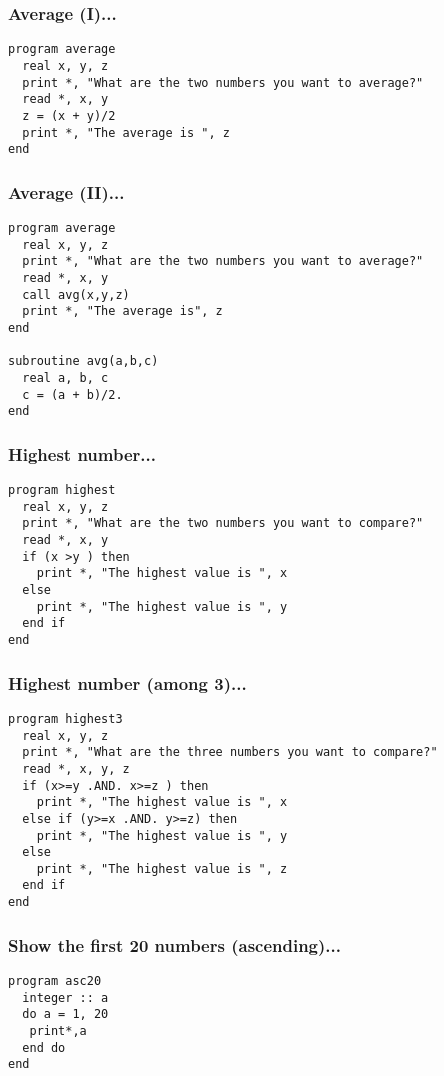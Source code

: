 \documentclass[xcolor=dvipsnames,dvip,notes=show,table]{beamer}
\begin{document}
\begin{frame}[fragile]
\frametitle{Average (I)...}

\scriptsize
\begin{lstlisting}
program average
  real x, y, z
  print *, "What are the two numbers you want to average?"
  read *, x, y
  z = (x + y)/2
  print *, "The average is ", z
end
\end{lstlisting}
\end{frame}


\begin{frame}[fragile]
\frametitle{Average (II)...}

\scriptsize
\begin{lstlisting}
program average
  real x, y, z
  print *, "What are the two numbers you want to average?"
  read *, x, y
  call avg(x,y,z)
  print *, "The average is", z
end
 
subroutine avg(a,b,c)
  real a, b, c
  c = (a + b)/2.
end
\end{lstlisting}
\end{frame}


\begin{frame}[fragile]
\frametitle{Highest number...}

\scriptsize
\begin{lstlisting}
program highest
  real x, y, z
  print *, "What are the two numbers you want to compare?"
  read *, x, y
  if (x >y ) then 
    print *, "The highest value is ", x
  else 
    print *, "The highest value is ", y
  end if
end
\end{lstlisting}
\end{frame}


\begin{frame}[fragile]
\frametitle{Highest number (among 3)...}

\scriptsize
\begin{lstlisting}
program highest3
  real x, y, z
  print *, "What are the three numbers you want to compare?"
  read *, x, y, z
  if (x>=y .AND. x>=z ) then 
    print *, "The highest value is ", x
  else if (y>=x .AND. y>=z) then
    print *, "The highest value is ", y
  else 
    print *, "The highest value is ", z
  end if
end
\end{lstlisting}
\end{frame}

\begin{frame}[fragile]
\frametitle{Show the first 20 numbers (ascending)...}

\scriptsize
\begin{lstlisting}
program asc20
  integer :: a
  do a = 1, 20
   print*,a
  end do
end
\end{lstlisting}
\end{frame}
\end{document}
